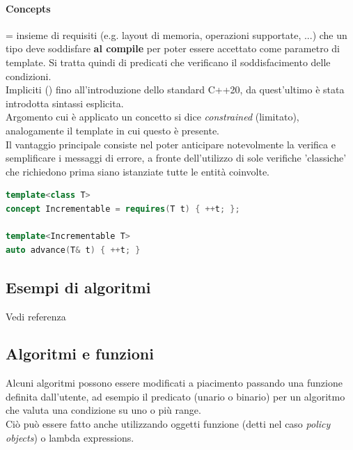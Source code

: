 \documentclass[10pt, oneside]{book}
\begin{document}
\paragraph{Concepts} = insieme di requisiti (e.g. layout di memoria, operazioni supportate, ...) che un tipo deve soddisfare \textbf{al compile} per poter essere accettato come parametro di template. Si tratta quindi di predicati che verificano il soddisfacimento delle condizioni.\\
Impliciti () fino all'introduzione dello standard C++20, da quest'ultimo è stata introdotta sintassi esplicita.\\
Argomento cui è applicato un concetto si dice \textit{constrained} (limitato), analogamente il template in cui questo è presente.\\
Il vantaggio principale consiste nel poter anticipare notevolmente la verifica e semplificare i messaggi di errore, a fronte dell'utilizzo di sole verifiche 'classiche' che richiedono prima siano istanziate tutte le entità coinvolte.
\begin{lstlisting}[language=C++]
template<class T>
concept Incrementable = requires(T t) { ++t; };

template<Incrementable T>
auto advance(T& t) { ++t; }
\end{lstlisting}

\subsection{Esempi di algoritmi}
Vedi referenza

\subsection{Algoritmi e funzioni}
Alcuni algoritmi possono essere modificati a piacimento passando una funzione definita dall'utente, ad esempio il predicato (unario o binario) per un algoritmo che valuta una condizione su uno o più range.\\
Ciò può essere fatto anche utilizzando oggetti funzione (detti nel caso \textit{policy objects}) o lambda expressions.
\end{document}

